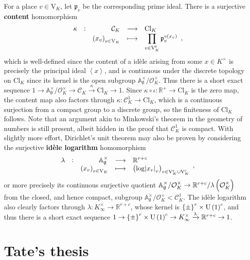 \documentclass{article}
\newcommand{\1}{\mathbbm{1}}
\renewcommand{\AA}{\mathbb{A}}
\newcommand{\br}{\del}
\renewcommand{\c}{\mathrm{c}}
\newcommand{\CCC}{\mathcal{C}}
\newcommand{\Cl}{\mathrm{Cl}}
\newcommand{\f}{\mathrm{f}}
\newcommand{\OOO}{\mathcal{O}}
\newcommand{\ppp}{\mathfrak{p}}
\renewcommand{\r}{\mathrm{r}}
\newcommand{\RR}{\mathbb{R}}
\newcommand{\U}{\mathrm{U}}
\newcommand{\V}{\mathrm{V}}
\newcommand{\abr}[1]{\left\langle #1 \right\rangle}
\newcommand{\function}[5]{
  \begin{array}{ccrcl}
    \displaystyle #1 & : & \displaystyle #2 & \longrightarrow & \displaystyle #3 \\
                     &   & \displaystyle #4 & \longmapsto     & \displaystyle #5
  \end{array}
}
\begin{document}
For a place $ v \in \V_K $, let $ \ppp_v $ be the corresponding prime ideal. There is a surjective \textbf{content} homomorphism
$$ \function{\kappa}{\CCC_K}{\Cl_K}{\br{x_v}_{v \in \V_K}}{\prod_{v \in \V_K^\f} \ppp_v^{v\br{x_v}}}, $$
which is well-defined since the content of a id\`ele arising from some $ x \in K^\times $ is precisely the principal ideal $ \abr{x} $, and is continuous under the discrete topology on $ \Cl_K $ since its kernel is the open subgroup $ \AA_\emptyset^\times / \OOO_K^\times $. Thus there is a short exact sequence $ 1 \to \AA_\emptyset^\times / \OOO_K^\times \to \CCC_K \xrightarrow{\kappa} \Cl_K \to 1 $. Since $ \kappa \circ \iota : \RR^+ \to \Cl_K $ is the zero map, the content map also factors through $ \kappa : \CCC_K^1 \to \Cl_K $, which is a continuous surjection from a compact group to a discrete group, so the finiteness of $ \Cl_K $ follows. Note that an argument akin to Minkowski's theorem in the geometry of numbers is still present, albeit hidden in the proof that $ \CCC_K^1 $ is compact. With slightly more effort, Dirichlet's unit theorem may also be proven by considering the surjective \textbf{id\`ele logarithm} homomorphism
$$ \function{\lambda}{\AA_\emptyset^\times}{\RR^{r + c}}{\br{x_v}_{v \in \V_K}}{\br{\log \abs{x_v}_v}_{v \in \V_K^\r \cup \V_K^\c}}, $$
or more precisely its continuous surjective quotient $ \AA_\emptyset^\times / \OOO_K^\times \to \RR^{r + c} / \lambda\br{\OOO_K^\times} $ from the closed, and hence compact, subgroup $ \AA_\emptyset^\times / \OOO_K^\times < \CCC_K^1 $. The id\`ele logarithm also clearly factors through $ \lambda : K_\infty^\times \to \RR^{r + c} $, whose kernel is $ \cbr{\pm}^r \times \U\br{1}^c $, and thus there is a short exact sequence $ 1 \to \cbr{\pm}^r \times \U\br{1}^c \to K_\infty^\times \xrightarrow{\lambda} \RR^{r + c} \to 1 $.

\pagebreak

\section{Tate's thesis}
\end{document}
